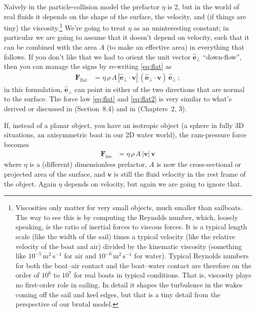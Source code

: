 \documentclass[letterpaper]{article}
\renewcommand{\vec}[1]{\boldsymbol{#1}}
\newcommand{\uvec}{\vec{\hat{e}}}
\renewcommand{\flat}{\text{flat}}
\newcommand{\iso}{\text{iso}}
\newcommand{\mmps}{\mathrm{m^2\,s^{-1}}}
\begin{document}
Na\"ively in the particle-collision model the prefactor $\eta$ is 2, but in the world of real fluids it depends on the shape of the surface, the velocity, and (if things are tiny) the viscosity.\footnote{%
Viscosities only matter for very small objects, much smaller than sailboats. The way to see this is by computing the Reynolds number, which, loosely speaking, is the ratio of inertial forces to viscous forces. It is a typical length scale (like the width of the sail) times a typical velocity (like the relative velocity of the boat and air) divided by the kinematic viscosity (something like $10^{-5}\,\mmps$ for air and $10^{-6}\,\mmps$ for water). Typical Reynolds numbers for both the boat--air contact and the boat--water contact are therefore on the order of $10^6$ to $10^7$ for real boats in typical conditions. That is, viscosity plays no first-order role in sailing. In detail it shapes the turbulence in the wakes coming off the sail and keel edges, but that is a tiny detail from the perspective of our brutal model.}
We're going to treat $\eta$ as an uninteresting constant; in particular we are going to assume that it doesn't depend on velocity, such that it can be combined with the area $A$ (to make an effective area) in everything that follows.
If you don't like that we had to orient the unit vector $\uvec_\perp$ ``down-flow'', then you can manage the signs by re-writing \eqref{eq:flat} as
\begin{align}\label{eq:flat2}
    \vec{F}_\flat &= \eta\,\rho\,A\,|\uvec_\perp\cdot\vec{v}|\,(\uvec_\perp\cdot\vec{v})\,\uvec_\perp ~;
\end{align}
in this formulation, $\uvec_\perp$ can point in either of the two directions that are normal to the surface.
The force law \eqref{eq:flat} and \eqref{eq:flat2} is very similar to what's derived or discussed in \cite{symmetry} (Section~8.4) and in \cite{pos} (Chapters~2, 3).

If, instead of a planar object, you have an isotropic object (a sphere in fully 3D situations, an axisymmetric boat in our 2D water world), the ram-pressure force becomes
\begin{align}\label{eq:iso}
    \vec{F}_\iso &= \eta\,\rho\,A\,|\vec{v}|\,\vec{v}
\end{align}
where $\eta$ is a (different) dimensionless prefactor, $A$ is now the cross-sectional or projected area of the surface, and $\vec{v}$ is still the fluid velocity in the rest frame of the object.
Again $\eta$ depends on velocity, but again we are going to ignore that.
\end{document}
